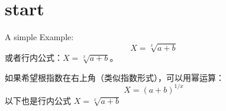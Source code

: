 \documentclass{ctexart}
\begin{document}
\section{start}
A simple Example:
\[
X = \sqrt[x]{a + b}
\]
或者行内公式：$X = \sqrt[x]{a + b}$。

如果希望根指数在右上角（类似指数形式），可以用幂运算：
\[
X = (a + b)^{1/x}
\]
以下也是行内公式
\(
X = \sqrt[x]{a + b}
\)
\end{document}
